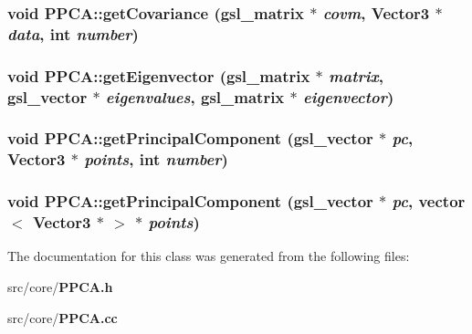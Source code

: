 \subsubsection{\setlength{\rightskip}{0pt plus 5cm}void PPCA::get\-Covariance (gsl\_\-matrix $\ast$ {\em covm}, Vector3 $\ast$ {\em data}, int {\em number})\hspace{0.3cm}{\tt  [static]}}\label{classPPCA_a301c4d080a1a272bf482fe2f3b1776e}


\subsubsection{\setlength{\rightskip}{0pt plus 5cm}void PPCA::get\-Eigenvector (gsl\_\-matrix $\ast$ {\em matrix}, gsl\_\-vector $\ast$ {\em eigenvalues}, gsl\_\-matrix $\ast$ {\em eigenvector})\hspace{0.3cm}{\tt  [static]}}\label{classPPCA_af77805ddf9ec68771d1c8818c6910c4}


\subsubsection{\setlength{\rightskip}{0pt plus 5cm}void PPCA::get\-Principal\-Component (gsl\_\-vector $\ast$ {\em pc}, Vector3 $\ast$ {\em points}, int {\em number})\hspace{0.3cm}{\tt  [static]}}\label{classPPCA_3893ed1ccc8a35b514eeccacfec671fd}


\subsubsection{\setlength{\rightskip}{0pt plus 5cm}void PPCA::get\-Principal\-Component (gsl\_\-vector $\ast$ {\em pc}, vector$<$ Vector3 $\ast$ $>$ $\ast$ {\em points})\hspace{0.3cm}{\tt  [static]}}\label{classPPCA_c0a281194ee7700e47bd09da55b903aa}




The documentation for this class was generated from the following files:\begin{CompactItemize}
\item 
src/core/{\bf PPCA.h}\item 
src/core/{\bf PPCA.cc}\end{CompactItemize}
